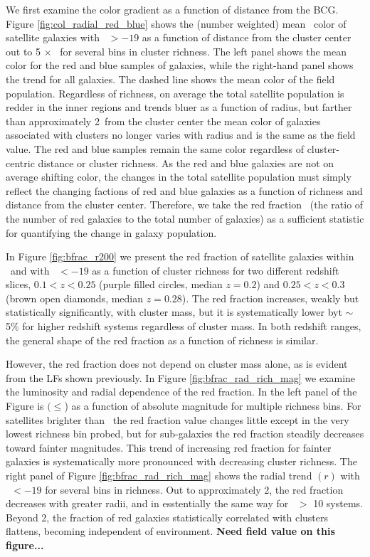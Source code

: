 \documentclass{emulateapj}
\begin{document}
We first examine the color gradient as a function of distance from the BCG. Figure \ref{fig:col_radial_red_blue} shows the (number weighted) mean  \gmr\ color of satellite galaxies with \Mi\ $> -19$ as a function of distance from the cluster center out to 5 $\times$ \rtwo\ for several bins in cluster richness. The left panel shows the mean color for the red and blue samples of galaxies, while the right-hand panel shows the trend for all galaxies. The dashed line shows the mean color of the field population. Regardless of richness, on average the total satellite population is redder in the inner regions and trends bluer as a function of radius, but farther than approximately 2\rtwo\ from the cluster center the mean color of galaxies associated with clusters no longer varies with radius and is the same as the field value. The red and blue samples remain the same color regardless of cluster-centric distance or cluster richness. As the red and blue galaxies are not on average shifting color, the changes in the total satellite population must simply reflect the changing factions of red and blue galaxies as a function of richness and distance from the cluster center. Therefore, we take the red fraction \fred\ (the ratio of the number of red galaxies to the total number of galaxies) as a sufficient statistic for quantifying the change in galaxy population.

In Figure \ref{fig:bfrac_r200} we present the red fraction of satellite galaxies within \rtwo\ and with \Mi\ $< -19$ as a function of cluster richness for two different redshift slices, $0.1 < z < 0.25$ (purple filled circles, median $z = 0.2$) and $0.25 < z < 0.3$ (brown open diamonds, median $z = 0.28$). The red fraction increases, weakly but statistically significantly, with cluster mass, but it is systematically lower byt $\sim$ 5\% for higher redshift systems regardless of cluster mass. In both redshift ranges, the general shape of the red fraction as a function of richness is similar.

However, the red fraction does not depend on cluster mass alone, as is evident from the LFs shown previously. In Figure \ref{fig:bfrac_rad_rich_mag} we examine the luminosity and radial dependence of the red
fraction. In the left panel of the Figure is \fred $(\le$\rtwo ) as a function of absolute
magnitude for multiple richness bins. For satellites brighter than
\lstar\ the red fraction value changes little except in the very
lowest richness bin probed, but for sub-\lstar galaxies the red
fraction steadily decreases toward fainter magnitudes. This trend of
increasing red fraction for fainter galaxies is systematically more
pronounced with decreasing cluster richness. The right panel of Figure \ref{fig:bfrac_rad_rich_mag} shows the radial trend \fred $(r)$ with \Mi\ $< -19$  for several bins in richness. Out to approximately 2\rtwo, the red fraction decreases with greater radii, and in esstentially the same way for \Ntwo\ $>$ 10 systems.  Beyond 2\rtwo, the fraction of red galaxies statistically correlated with clusters flattens, becoming independent of environment. {\bf Need field value on this figure...}
\end{document}
